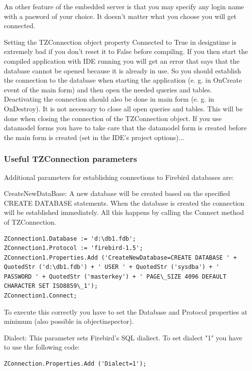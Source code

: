 \documentclass[a4paper,12pt,oneside]{book}
\begin{document}
An other feature of the embedded server is that you may specify any login name with a pasword of your choice.
It doesn't matter what you choose you will get connected.

Setting the TZConnection object property Connected to True in designtime is extremely bad if you don't reset it to False before compiling.
If you then start the compiled application with IDE running you will get an error that says that the database cannot be opened because it is already in use.
So you should establish the connection to the database when starting the application (e. g. in OnCreate event of the main form) and then open the needed queries and tables.
Deactivating the connection should also be done in main form (e. g. in OnDestroy).
It is not necessary to close all open queries and tables.
This will be done when closing the connection of the TZConnection object.
If you use datamodel forms you have to take care that the datamodel form is created before the main form is created (set in the IDE's project options)...

\subsubsection{Useful TZConnection parameters}

Additional parameters for establishing connections to Firebird databases are:

CreateNewDataBase:
A new database will be created based on the specified CREATE DATABASE statements.
When the database is created the connection will be established immediately.
All this happens by calling the Connect method of TZConnection.
\begin{verbatim}
ZConnection1.Database := 'd:\db1.fdb';
ZConnection1.Protocol := 'firebird-1.5';
ZConnection1.Properties.Add ('CreateNewDatabase=CREATE DATABASE ' + QuotedStr ('d:\db1.fdb') + ' USER ' + QuotedStr ('sysdba') + ' PASSWORD ' + QuotedStr ('masterkey') + ' PAGE\_SIZE 4096 DEFAULT CHARACTER SET ISO8859\_1');
ZConnection1.Connect;
\end{verbatim}

To execute this correctly you have to set the Database and Protocol properties at minimum (also possible in objectinspector).

Dialect:
This parameter sets Firebird's SQL dialiect. To set dialect "1" you have to use the following code:
\begin{verbatim}
ZConnection.Properties.Add ('Dialect=1');
\end{verbatim}
\end{document}
